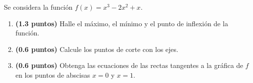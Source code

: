 
Se considera la función $f(x)=x^3-2x^2+x$.
\begin{enumerate}[label=\alph*)]
\item \textbf{(1.3 puntos)} Halle el máximo, el mínimo y el punto de inflexión de la función.
\item \textbf{(0.6 puntos)} Calcule los puntos de corte con los ejes.
\item \textbf{(0.6 puntos)} Obtenga las ecuaciones de las rectas tangentes a la gráfica de $f$ en los puntos de abscisas $x=0$ y $x=1$.
\end{enumerate}
